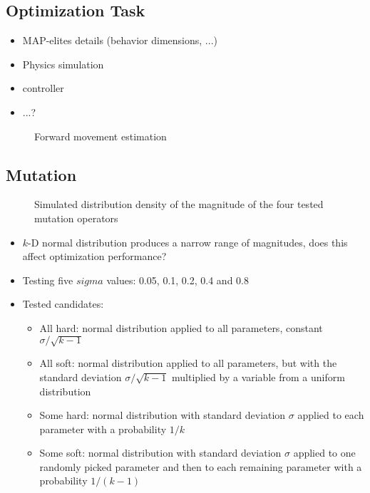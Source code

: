 \documentclass[sigconf, anonymous=false]{acmart}
\begin{document}
\subsection{Optimization Task}\label{method:task}

\begin{itemize}
\item MAP-elites details (behavior dimensions, ...)
\item Physics simulation 
\item controller
\item ...?
\end{itemize}

\begin{figure}

\vspace{-18pt}
\caption{Forward movement estimation}
\end{figure}


\subsection{Mutation}\label{method:mutate}
\begin{figure}

\vspace{-12pt}
\caption{Simulated distribution density of the magnitude of the four tested mutation operators}
\end{figure}
\begin{itemize}
\item $k$-D normal distribution produces a narrow range of magnitudes, does this affect optimization performance?
\item Testing five $sigma$ values: 0.05, 0.1, 0.2, 0.4 and 0.8
\item Tested candidates:
\begin{itemize}
\item All hard: normal distribution applied to all parameters, constant $\sigma/\sqrt{k-1}$
\item All soft: normal distribution applied to all parameters, but with the standard deviation $\sigma/\sqrt{k-1}$ multiplied by a variable from a uniform distribution
\item Some hard: normal distribution with standard deviation $\sigma$ applied to each parameter with a probability $1/k$
\item Some soft: normal distribution with standard deviation $\sigma$ applied to one randomly picked parameter and then to each remaining parameter with a probability $1/(k-1)$
\end{itemize}
\end{itemize}
\end{document}

